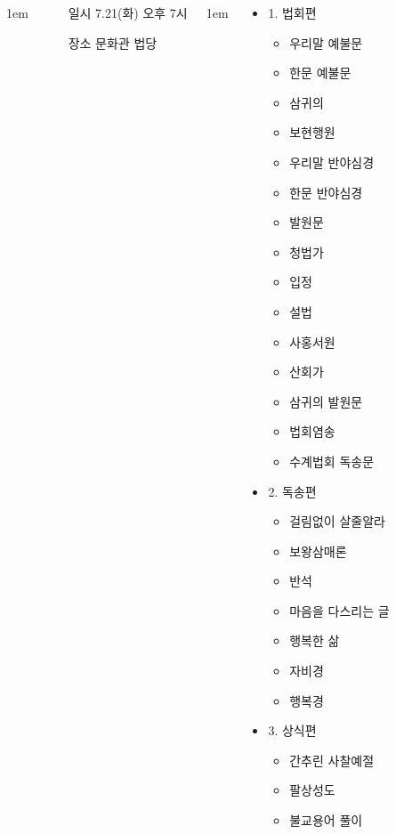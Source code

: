 \documentclass[	20pt, 
							a1paper, 
							portrait, %
							margin=0mm, %
							innermargin=10mm,  		%
							colspace=5mm, 
							subcolspace=0mm
							]{tikzposter}
\begin{document}
\begin{columns}
			{
					\setlength{\leftmargini}{4em}
					\setlength{\labelsep} {1em}
				\begin{LARGE}
					\begin{itemize}
					\item [일시] 7.21(화) 오후 7시
					\item [장소] 문화관 법당
					\end{itemize}
				\end{LARGE}
			}







			{
					\setlength{\leftmargini}{2em}
					\setlength{\labelsep} {1em}
				\begin{LARGE}
					\begin{itemize}
					\item 1. 법회편
						\begin{itemize}
						\item 우리말 예불문
						\item 한문 예불문
						\item 삼귀의
						\item 보현행원
						\item 우리말 반야심경
						\item 한문 반야심경
						\item 발원문
						\item 청법가
						\item 입정
						\item 설법
						\item 사홍서원
						\item 산회가
						\item 삼귀의 발원문
						\item 법회염송
						\item 수계법회 독송문
						\end{itemize}
					\item 2. 독송편
						\begin{itemize}
						\item 걸림없이 살줄알라
						\item 보왕삼매론
						\item 반석
						\item 마음을 다스리는 글
						\item 행복한 삶
						\item 자비경
						\item 행복경
						\end{itemize}
					\item 3. 상식편
						\begin{itemize}
						\item 간추린 사찰예절
						\item 팔상성도
						\item 불교용어 풀이
						\end{itemize}


\end{itemize}
\end{LARGE}}
\end{columns}
\end{document}
